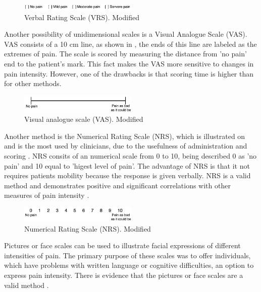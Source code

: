 \begin{figure}[H]
	\includegraphics[width=0.5\textwidth]{figures/VRS.png} 
	\caption{Verbal Rating Scale (VRS). Modified~\cite{Jensen2001}}
	\label{fig:VRS}  
\end{figure}   

Another possibility of unidimensional scales is a Visual Analogue Scale (VAS). VAS consists of a 10 cm line, as shown in , the ends of this line are labeled as the extremes of pain. The scale is scored by measuring the distance from 'no pain' end to the patient's mark. This fact makes the VAS more sensitive to changes in pain intensity. However, one of the drawbacks is that scoring time is higher than for other methods.~\cite{Jensen2001} 

\begin{figure}[H]
	\includegraphics[width=0.5\textwidth]{figures/VAS.png} 
	\caption{Visual analogue scale (VAS). Modified~\cite{Jensen2001}}
	\label{fig:VAS}  
\end{figure}   

Another method is the Numerical Rating Scale (NRS), which is illustrated on  and is the most used by clinicians, due to the usefulness of administration and scoring  \cite{Fillingim2016}. NRS consits of an numerical scale from 0 to 10, being described 0 as 'no pain' and  10 equal to 'higest level of pain'. The advantage of NRS is that it not requires patients mobility because the response is given verbally. NRS is a valid method and demonstrates positive and significant correlations with other measures of pain intensity \cite{Jensen2001}. 

\begin{figure}[H]
	\includegraphics[width=0.5\textwidth]{figures/NRS.png} 
	\caption{Numerical Rating Scale (NRS). Modified~\cite{Jensen2001}}
	\label{fig:NRS}  
\end{figure}   

Pictures or face scales can be used to illustrate facial expressions of different intensities of pain. The primary purpose of these scales was to offer individuals, which have problems with written language or cognitive difficulties, an option to express pain intensity. There is evidence that the pictures or face scales are a valid method \cite{Jensen2001}. 


